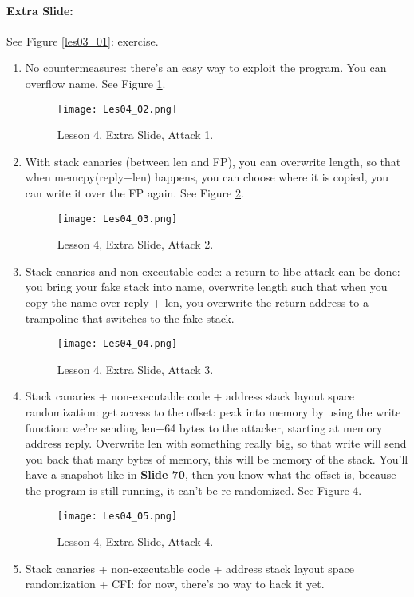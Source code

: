 \documentclass[10pt,a4paper]{report}
\begin{document}
\paragraph{Extra Slide:} See Figure \ref{les03_01}: exercise.
\begin{enumerate}
\item No countermeasures: there's an easy way to exploit the program. You can overflow name. See Figure \ref{les04_02}.

\begin{figure}[ht!]
\centering
\texttt{[image: Les04\_02.png]}
\caption{Lesson 4, Extra Slide, Attack 1.} 
\label{les04_02}
\end{figure}

\item With stack canaries (between len and FP), you can overwrite length, so that when memcpy(reply+len) happens, you can choose where it is copied, you can write it over the FP again. See Figure \ref{les04_03}.

\begin{figure}[ht!]
\centering
\texttt{[image: Les04\_03.png]}
\caption{Lesson 4, Extra Slide, Attack 2.} 
\label{les04_03}
\end{figure}

\item  Stack canaries and non-executable code: a return-to-libc attack can be done: you bring your fake stack into name, overwrite length such that when you copy the name over reply + len, you overwrite the return address to a trampoline that switches to the fake stack.

\begin{figure}[ht!]
\centering
\texttt{[image: Les04\_04.png]}
\caption{Lesson 4, Extra Slide, Attack 3.} 
\label{les04_04}
\end{figure}

\item Stack canaries + non-executable code + address stack layout space randomization: get access to the offset: peak into memory by using the write function: we're sending len+64 bytes to the attacker, starting at memory address reply. Overwrite len with something really big, so that write will send you back that many bytes of memory, this will be memory of the stack. You'll have a snapshot like in \textbf{Slide 70}, then you know what the offset is, because the program is still running, it can't be re-randomized.  See Figure \ref{les04_05}.

\begin{figure}[ht!]
\centering
\texttt{[image: Les04\_05.png]}
\caption{Lesson 4, Extra Slide, Attack 4.} 
\label{les04_05}
\end{figure}

\item Stack canaries + non-executable code + address stack layout space randomization + CFI: for now, there's no way to hack it yet.
\end{enumerate}	
	
\end{document}
